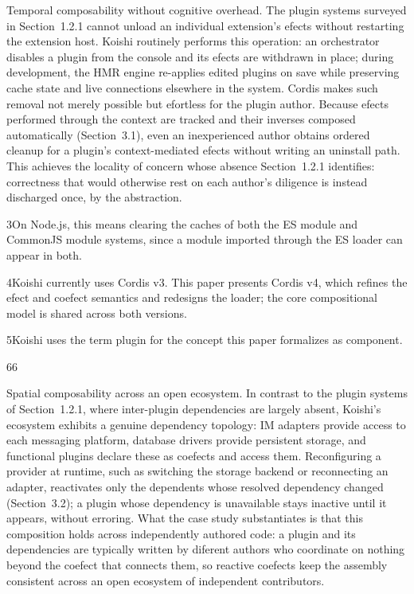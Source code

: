 \documentclass[
  10
]{article}
\begin{document}
Temporal composability without cognitive overhead. The plugin systems
surveyed in Section~1.2.1 cannot unload an individual extension's efects
without restarting the extension host. Koishi routinely performs this
operation: an orchestrator disables a plugin from the console and its
efects are withdrawn in place; during development, the HMR engine
re-applies edited plugins on save while preserving cache state and live
connections elsewhere in the system. Cordis makes such removal not
merely possible but efortless for the plugin author. Because efects
performed through the context are tracked and their inverses composed
automatically (Section~3.1), even an inexperienced author obtains
ordered cleanup for a plugin's context-mediated efects without writing
an uninstall path. This achieves the locality of concern whose absence
Section~1.2.1 identifies: correctness that would otherwise rest on each
author's diligence is instead discharged once, by the abstraction.

3On Node.js, this means clearing the caches of both the ES module and
CommonJS module systems, since a module imported through the ES loader
can appear in both.

4Koishi currently uses Cordis v3. This paper presents Cordis v4, which
refines the efect and coefect semantics and redesigns the loader; the
core compositional model is shared across both versions.

5Koishi uses the term plugin for the concept this paper formalizes as
component.

66

Spatial composability across an open ecosystem. In contrast to the
plugin systems of Section~1.2.1, where inter-plugin dependencies are
largely absent, Koishi's ecosystem exhibits a genuine dependency
topology: IM adapters provide access to each messaging platform,
database drivers provide persistent storage, and functional plugins
declare these as coefects and access them. Reconfiguring a provider at
runtime, such as switching the storage backend or reconnecting an
adapter, reactivates only the dependents whose resolved dependency
changed (Section~3.2); a plugin whose dependency is unavailable stays
inactive until it appears, without erroring. What the case study
substantiates is that this composition holds across independently
authored code: a plugin and its dependencies are typically written by
diferent authors who coordinate on nothing beyond the coefect that
connects them, so reactive coefects keep the assembly consistent across
an open ecosystem of independent contributors.
\end{document}
